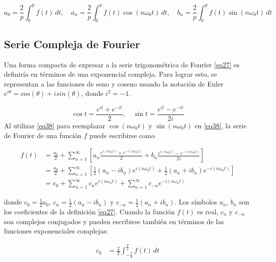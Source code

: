 \begin{equation}\label{eq37}
	a_0 = \frac{2}{p} \int_{0}^{p} f(t) \, dt, \quad a_n = \frac{2}{p} \int_{0}^{p} f(t) \cos(n\omega_0 t) \, dt, \quad b_n = \frac{2}{p} \int_{0}^{p} f(t) \sin(n\omega_0 t) \, dt
\end{equation}

\subsection{Serie Compleja de Fourier}
Una forma compacta de expresar a la serie trigonométrica de Fourier \eqref{eq27} es definiría en términos de una exponencial compleja. Para lograr esto, se representan a las funciones de seno y coseno usando la notación de Euler $e^{i\theta} = cos(\theta) + isin(\theta)$, donde $i^{2} = -1$. ~\cite{youtubeComplexFourier}

\begin{equation}\label{eq38}
	\cos t = \frac{e^{it} + e^{-it}}{2}, \quad \sin t = \frac{e^{it} - e^{-it}}{2i}
\end{equation}
Al utilizar \eqref{eq38} para reemplazar $\cos \left(n\omega_0 t\right)$ y $\sin \left(n\omega_0 t\right)$ en \eqref{eq38}, la serie de Fourier de una función $f$ puede escribirse como

\begin{equation} \label{eq39}
	\begin{split}
		f(t) &= \frac{a_0}{2} + \sum_{n=1}^{\infty} \left[a_n \frac{e^{i(n\omega_0 t)} + e^{-i(n\omega_0 t)}}{2} + b_n \frac{e^{i(n\omega_0 t)} - e^{-i(n\omega_0 t)}}{2i}\right] \\
		&= \frac{a_0}{2} + \sum_{n=1}^{\infty} \left[\frac{1}{2} \left(a_n - i b_n\right) e^{i (n\omega_0 t)} + \frac{1}{2} \left(a_n + i b_n\right) e^{-i (n\omega_0 t)}\right] \\
		&= c_0 + \sum_{n=1}^{\infty} c_n e^{i (n\omega_0 t)} + \sum_{n=1}^{\infty} c_{-n} e^{-i(n\omega_0 t)}
	\end{split}
\end{equation}


donde $c_0 = \frac{1}{2} a_0$, $c_n = \frac{1}{2} (a_n - i b_n)$ y $c_{-n} = \frac{1}{2} (a_n + i b_n)$. Los símbolos $a_n$, $b_n$ son los coeficientes de la definición \eqref{eq27}. Cuando la función $f(t)$ es real, $c_n$ y $c_{-n}$ son complejos conjugados y pueden escribirse también en términos de las funciones exponenciales complejas:

\begin{equation} \label{eq40}
	\begin{split}
		c_0 &= \frac{2}{T} \int_{-\frac{T}{2}}^{\frac{T}{2}} f(t) \, dt \\
	\end{split}
\end{equation}

